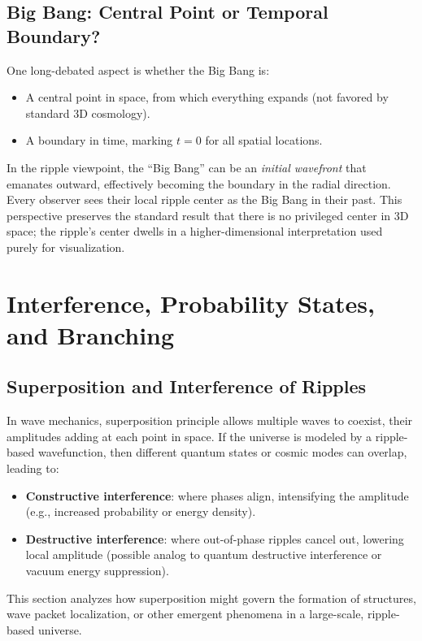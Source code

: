 \documentclass[11pt]{article}
\begin{document}
\subsection{Big Bang: Central Point or Temporal Boundary?}
\label{subsec:bigbang-center}
One long-debated aspect is whether the Big Bang is:
\begin{itemize}
  \item A central point in space, from which everything expands 
        (not favored by standard 3D cosmology).
  \item A boundary in time, marking \(t=0\) for all spatial locations.
\end{itemize}
In the ripple viewpoint, the ``Big Bang'' can be an \emph{initial wavefront} 
that emanates outward, effectively becoming the boundary in the radial 
direction. Every observer sees their local ripple center as the Big Bang 
in their past. This perspective preserves the standard result that 
there is no privileged center in 3D space; the ripple's center 
dwells in a higher-dimensional interpretation used purely for 
visualization.

\section{Interference, Probability States, and Branching}
\label{sec:interference-branching}

\subsection{Superposition and Interference of Ripples}
\label{subsec:superposition}
In wave mechanics, superposition principle allows multiple waves to 
coexist, their amplitudes adding at each point in space. If the 
universe is modeled by a ripple-based wavefunction, then different 
quantum states or cosmic modes can overlap, leading to:
\begin{itemize}
  \item \textbf{Constructive interference}: where phases align, 
        intensifying the amplitude (e.g., increased probability 
        or energy density).
  \item \textbf{Destructive interference}: where out-of-phase 
        ripples cancel out, lowering local amplitude (possible 
        analog to quantum destructive interference or vacuum 
        energy suppression).
\end{itemize}
This section analyzes how superposition might govern the formation 
of structures, wave packet localization, or other emergent phenomena 
in a large-scale, ripple-based universe.
\end{document}

